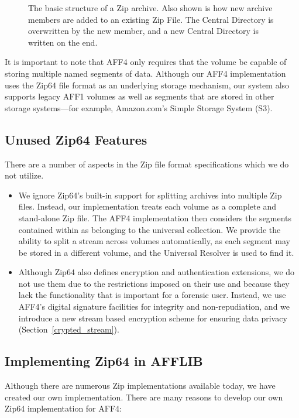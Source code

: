 \documentclass[10pt, conference]{IEEEtran}
\begin{document}
{{\begin{figure}[tbp]
\begin{center}
  \caption{The basic structure of a Zip archive. Also shown is how new
  archive members are added to an existing Zip File. The Central
  Directory is overwritten by the new member, and a new Central
  Directory is written on the end.  }

  \label{zip_structure}
  \end{center}
\end{figure}

It is important to note that AFF4 only requires that the volume be
capable of storing multiple named segments of data. Although our AFF4
implementation uses the Zip64 file format as an underlying storage
mechanism, our system also supports legacy AFF1 volumes as well as
segments that are stored in other storage systems---for example,
Amazon.com's Simple Storage System (S3)\cite{s3-aws-home-page-money}.

\subsection{Unused Zip64 Features}
There are a number of aspects in the Zip file format specifications
which we do not utilize.
\begin{itemize}
\item We ignore Zip64's built-in support for splitting
archives into multiple Zip files. Instead, our implementation treats
each volume as a complete and stand-alone Zip file. The AFF4
implementation then considers the segments contained within as
belonging to the universal collection. We provide the ability to split
a stream across volumes automatically, as each segment may be stored
in a different volume, and the Universal Resolver is used to find it.

\item Although Zip64 also defines encryption and authentication
extensions, we do not use them due to the restrictions imposed on
their use and because they lack the functionality that is important
for a forensic user. Instead, we use AFF4's digital signature
facilities for integrity and non-repudiation, and we introduce a new
stream based encryption scheme for ensuring data privacy
(Section~\ref{crypted_stream}).

\end{itemize}

\subsection{Implementing Zip64 in AFFLIB}
Although there are numerous Zip implementations available today, we
have created our own implementation. There are many reasons to develop
our own Zip64 implementation for AFF4:

}}
\end{document}
